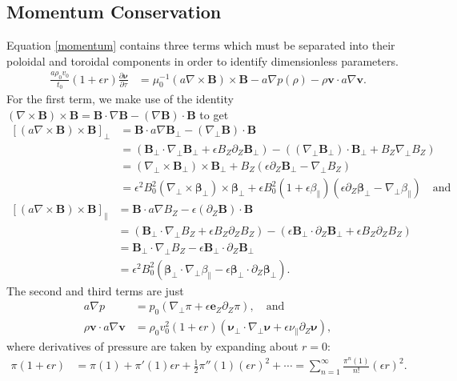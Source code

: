 \documentclass{article}
\newcommand{\para}{\parallel}
\newcommand{\ep}{\epsilon}
\newcommand{\np}{\nabla_\perp}
\newcommand{\p}{\partial}
\newcommand{\deriv}[2]{\frac{\p #1}{\p #2}}
\newcommand{\pth} [1] {\left( #1 \right) }
\newcommand{\br} [1] {\left[ #1 \right] }
\begin{document}
\subsection{Momentum Conservation}
Equation \eqref{momentum} contains three terms which must be separated into their poloidal and toroidal components in order to identify dimensionless parameters.
\begin{align*}
    \frac{a\rho_0v_0}{t_0} \pth{1+\ep r} \deriv{\bm{\nu}}{\tau} &= \mu_0^{-1} \pth{a\nabla\times \bm{B}} \times \bm{B} - a\nabla p(\rho) - \rho \bm{v}\cdot a\nabla \bm{v}. 
\end{align*}
For the first term, we make use of the identity $\pth{\nabla\times\bm{B}}\times\bm{B} = \bm{B}\cdot\nabla\bm{B} - \pth{\nabla\bm{B}}\cdot\bm{B}$ to get 
\begin{align*}
    \br{\pth{a\nabla\times\bm{B}}\times\bm{B}}_\perp &= \bm{B}\cdot a\nabla\bm{B}_\perp - \pth{\np\bm{B}}\cdot\bm{B} \\ 
    &= \pth{\bm{B}_\perp\cdot\np\bm{B}_\perp + \ep B_Z\p_Z\bm{B}_\perp} - \pth{\pth{\np\bm{B}_\perp} \cdot\bm{B}_\perp + B_Z\np B_Z} \\ 
    &= \pth{\np\times\bm{B}_\perp}\times\bm{B}_\perp + B_Z\pth{\ep\p_Z\bm{B}_\perp - \np B_Z} \\ 
    &= \ep^2 B_0^2 \pth{\np\times\bm{\beta}_\perp}\times\bm{\beta}_\perp + \ep B_0^2 \pth{1+\ep\beta_\para} \pth{\ep\p_Z\bm{\beta}_\perp - \np\beta_\para} \quad\text{and}
\end{align*}
\begin{align*}
    \br{\pth{a\nabla\times\bm{B}}\times\bm{B}}_\para &= \bm{B}\cdot a\nabla B_Z - \ep\pth{\p_Z\bm{B}}\cdot\bm{B} \\ 
    &= \pth{\bm{B}_\perp\cdot\np B_Z + \ep B_Z\p_Z B_Z} - \pth{\ep\bm{B}_\perp\cdot\p_Z\bm{B}_\perp + \ep B_Z\p_ZB_Z} \\ 
    &= \bm{B}_\perp\cdot \np B_Z - \ep\bm{B}_\perp\cdot \p_Z\bm{B}_\perp \\ 
    &= \ep^2B_0^2 \pth{\bm{\beta}_\perp\cdot\np\beta_\para - \ep\bm{\beta}_\perp\cdot\p_Z\bm{\beta}_\perp}.
\end{align*}
The second and third terms are just   
\begin{align*}
    a\nabla p &= p_0\pth{\np\pi + \ep\bm{e}_Z\p_Z\pi}, \quad\text{and} \\ 
    \rho\bm{v}\cdot a\nabla\bm{v} &= \rho_0v_0^2 \pth{1+\ep r} \pth{\bm{\nu}_\perp\cdot\np\bm{\nu} + \ep\nu_\para\p_Z\bm{\nu}}, 
\end{align*}
where derivatives of pressure are taken by expanding about $r=0$:
\begin{align*}
    \pi\pth{1+\ep r} &= \pi(1) + \pi'(1)\ep r + \frac{1}{2}\pi''(1)\pth{\ep r}^2 + \cdots = \sum_{n=1}^\infty \frac{\pi^{n}(1)}{n!}\pth{\ep r}^2.
\end{align*} 
\end{document}
